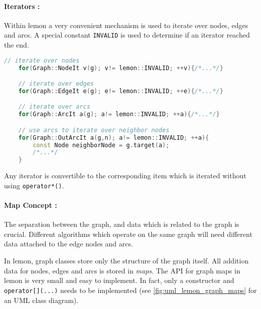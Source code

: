 \paragraph{Iterators :}
    Within lemon a very convenient mechanism is used to iterate over
    nodes, edges and arcs.
    A special constant \lstinline{INVALID} is used to determine if 
    an iterator reached the end.

    \begin{minipage}{\textwidth}\vspace{-0.75cm}\begin{lstlisting}[language=c++]
    // iterate over nodes
    for(Graph::NodeIt v(g); v!= lemon::INVALID; ++v){/*...*/}

    // iterate over edges
    for(Graph::EdgeIt e(g); e!= lemon::INVALID; ++e){/*...*/}

    // iterate over arcs
    for(Graph::ArcIt a(g); a!= lemon::INVALID; ++a){/*...*/}

    // use arcs to iterate over neighbor nodes
    for(Graph::OutArcIt a(g,n); a!= lemon::INVALID; ++a){
        const Node neighborNode = g.target(a);
        /*...*/
    }
    \end{lstlisting}\end{minipage}\vspace{0.5cm}

    Any iterator is convertible to the corresponding item which
    is iterated without using \lstinline{operator*()}.

\paragraph{Map Concept :}
    The separation between the graph, and data which is related to
    the graph is crucial.
    Different algorithms which operate on the same graph will
    need different data attached to the edge nodes and arcs. 

    In lemon, graph classes store only the structure of the graph itself.
    All addition data for nodes, edges and arcs is stored 
    in \emph{maps}.
    The API for graph maps in lemon is very small and easy to implement.
    In fact, only a constructor and \lstinline{operator[](...)} needs
    to be implemented (see \cref{fig:uml_lemon_graph_maps} for an UML class diagram).



